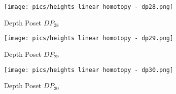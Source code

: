 \documentclass{article}
\begin{document}
\begin{figure}[h]
    \centering
    \texttt{[image: pics/heights linear homotopy - dp28.png]}
    \caption{Depth Poset $DP_{28}$}
    \label{fig:dp28}
\end{figure}
\begin{figure}[h]
    \centering
    \texttt{[image: pics/heights linear homotopy - dp29.png]}
    \caption{Depth Poset $DP_{29}$}
    \label{fig:dp29}
\end{figure}
\begin{figure}[h]
    \centering
    \texttt{[image: pics/heights linear homotopy - dp30.png]}
    \caption{Depth Poset $DP_{30}$}
    \label{fig:dp30}
\end{figure}
\end{document}
